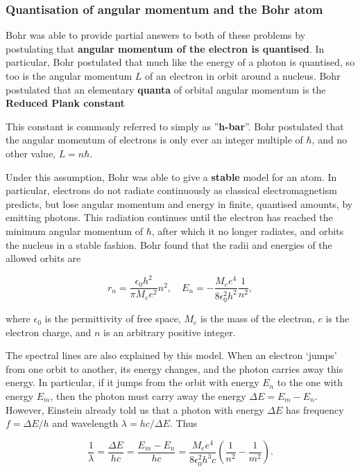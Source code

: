 \documentclass[9pt,Preprint]{lapreprint}
\begin{document}
\subsubsection{Quantisation of angular momentum and the Bohr atom}\label{Quantisation of angular momentum and the Bohr atom}

Bohr was able to provide partial answers to both of these problems by postulating that \textbf{angular momentum of the electron is quantised}. In particular, Bohr postulated that much like the energy of a photon is quantised, so too is the angular momentum $L$ of an electron in orbit around a nucleus. Bohr postulated that an elementary \textbf{quanta} of orbital angular momentum is the \textbf{Reduced Plank constant}

This constant is commonly referred to simply as ''\textbf{h-bar}''. Bohr postulated that the angular momentum of electrons is only ever an integer multiple of $\hbar$, and no other value, $L = n\hbar$.

Under this assumption, Bohr was able to give a \textbf{stable} model for an atom. In particular, electrons do not radiate continuously as classical electromagnetism predicts, but lose angular momentum and energy in finite, quantised amounts, by emitting photons. This radiation continues until the electron has reached the minimum angular momentum of $\hbar$, after which it no longer radiates, and orbits the nucleus in a stable fashion. Bohr found that the radii and energies of the allowed orbits are

\begin{equation}
\label{e-Bohr-relations}
r_n = \frac{\epsilon_0 h^2 }{\pi M_e e^2}n^2,\quad E_n = -\frac{M_e e^4}{8 \epsilon_0^2 h^2} \frac{1}{n^2},
\end{equation}

where $\epsilon_0$ is the permittivity of free space, $M_e$ is the mass of the electron, $e$ is the electron charge, and $n$ is an arbitrary positive integer.

The spectral lines are also explained by this model. When an electron `jumps' from one orbit to another, its energy changes, and the photon carries away this energy. In particular, if it jumps from the orbit with energy $E_n$ to the one with energy $E_m$, then the photon must carry away the energy $\Delta E = E_m - E_n$.  However, Einstein already told us that a photon with energy $\Delta E$ has frequency $f = \Delta E/h$ and wavelength $\lambda = hc/\Delta E$. Thus

\begin{equation}
\frac{1}{\lambda} = \frac{\Delta E}{hc} = \frac{E_m - E_n}{hc} = \frac{M_e e^4}{8 \epsilon_0^2 h^3 c}\left(\frac{1}{n^2} - \frac{1}{m^2}\right).
\end{equation}
\end{document}
